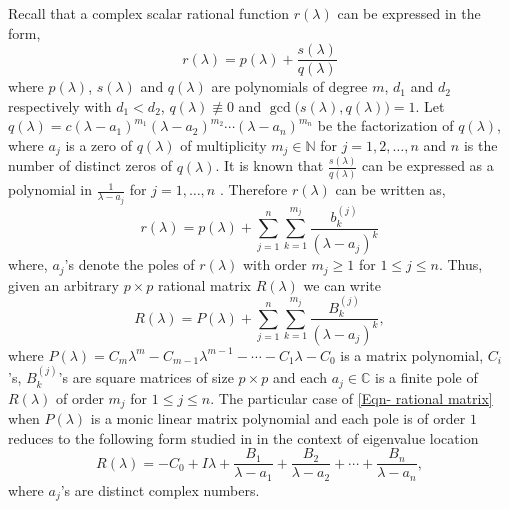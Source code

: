 \documentclass[12pt, reqno]{amsart}
\theoremstyle{definition}
\theoremstyle{remark}
\numberwithin{equation}{section}
\begin{document}
Recall that a complex scalar rational function $r(\lambda)$ can 
be expressed in the form, 
\begin{equation}\label{Eqn-scalar rational function}
\displaystyle r(\lambda) = p(\lambda) +  \frac{s(\lambda)}{q(\lambda)} 	
\end{equation}
where $p(\lambda)$, $s(\lambda)$ and $q(\lambda)$ are polynomials of degree $m$, 
$d_1$ and $d_2$ respectively with $d_1<d_2$, $q(\lambda) \not \equiv 0$ and 
$\gcd\textbf{(}s(\lambda), q(\lambda)\textbf{)} =1$. Let $q(\lambda) = 
c(\lambda-a_1)^{m_1} (\lambda-a_2)^{m_2} \cdots (\lambda-a_n)^{m_n}$ 
be the factorization of $q(\lambda)$, where $a_j$ is a zero of $q(\lambda)$ of 
multiplicity $m_j \in \mathbb{N}$ for $j=1,2,\ldots,n$ and $n$ is the number of 
distinct zeros of $q(\lambda)$. It is known that $\displaystyle 
\frac{s(\lambda)}{q(\lambda)}$ can be expressed as a polynomial in $\displaystyle 
\frac{1}{\lambda-a_j}$ for $j =1, \ldots, n$ \cite{Ponnusamy}. 
Therefore $r(\lambda)$ can be written as,
\begin{equation}\label{Eqn-scalar rational function-general form}
r(\lambda) = p(\lambda) + \displaystyle \sum_{j=1}^{n} \sum_{k=1}^{m_j} 
\frac{b_k^{(j)}}{(\lambda-a_j)^k}
\end{equation}
where, $a_j$'s denote the poles of $r(\lambda)$ with order $m_j \geq 1$ for 
$1 \leq j \leq n$. Thus, given an arbitrary $p \times p$ rational 
matrix $R(\lambda)$ we can write 
\begin{equation}\label{Eqn- rational matrix}
R(\lambda) = P(\lambda) +\displaystyle \sum_{j=1}^{n} \sum_{k=1}^{m_j} 
\frac{B_k^{(j)}}{(\lambda-a_j)^k},
\end{equation}
where $P(\lambda)=C_m\lambda^m- C_{m-1}\lambda^{m-1} - \cdots -C_1 \lambda - C_0$ 
is a matrix polynomial, $C_i$'s, $B_k^{(j)}$'s are square matrices of size 
$p\times p$ and each $a_j \in \mathbb{C}$ is a finite pole of $R(\lambda)$ of order 
$m_j$ for $1 \leq j \leq n$. The particular case of \eqref{Eqn- rational matrix} 
when $P(\lambda)$ is a monic linear matrix polynomial and each pole is of order 
$1$ reduces to the following form studied in \cite{Hadimani-Pallavi-Jayaraman} in 
the context of eigenvalue location  
\begin{equation}\label{Eqn-rational matrix-linear}
R(\lambda) = \displaystyle -C_0 +I\lambda +\frac{B_1}{\lambda-a_1}+ 
\frac{B_2}{\lambda-a_2} + \cdots + \frac{B_n} {\lambda-a_n},
\end{equation} 
where $a_j$'s are distinct complex numbers. 
\end{document}
